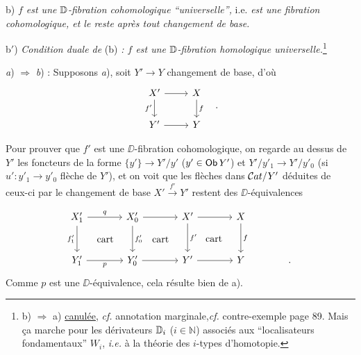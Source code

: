 \hspace*{\parindent}b) \textit{$f$ est une $\mathbb{D}$-fibration cohomologique ``universelle'',} i.e. \textit{est une fibration cohomologique, et le reste après tout changement de base.}

\hspace*{\parindent}b$'$) \textit{Condition duale de} (b) \textit{: $f$ est une $\mathbb{D}$-fibration homologique universelle.}\footnote[36]{b) $\Rightarrow$ a) \underline{canulée}, \textit{cf.} annotation marginale,\footnotemark[37] \textit{cf.} contre-exemple page 89. Mais ça marche pour les dérivateurs $\mathbb{D}_i$ ($i \in \mathbb{N}$) associés aux ``localisateurs fondamentaux'' $W_i$, \textit{i.e.} à la théorie des $i$-types d'homotopie.}

\textit{a}) $\Rightarrow$ \textit{b}) : Supposons \textit{a}), soit $Y' \to Y$ changement de base, d'où
\[
\begin{tikzcd}
X' \arrow[r] \arrow[d, "f'"'] & X \arrow[d, "f"] \\
Y' \arrow[r] & Y
\end{tikzcd}
\quad .
\]


Pour prouver que $f'$ est une $\DD$-fibration cohomologique, on regarde au dessus de $Y'$ les foncteurs de la forme $\{y'\} \to Y'/y'$ ($y' \in \mathsf{Ob}\, Y'$) et $Y'/y'_1 \to Y'/y'_0$ (si $u' : y'_1 \to y'_0$ flèche de $Y'$), et on voit que les flèches dans $\mathcal{C}at/Y'$ déduites de ceux-ci par le changement de base $X' \xrightarrow{f'} Y'$ restent des $\DD$-équivalences


\[
\begin{tikzcd}[column sep=large, row sep=large]
X'_1 \arrow[r, "q"] \arrow[d, "f'_1"'] \arrow[dr, phantom, "\text{cart}"] & X'_0 \arrow[r] \arrow[d, "f'_0"] \arrow[dr, phantom, "\text{cart}"] & X' \arrow[r] \arrow[d, "f'"] \arrow[dr, phantom, "\text{cart}"] & X \arrow[d, "f"] \\
Y'_1 \arrow[r, "p"'] & Y'_0 \arrow[r] & Y' \arrow[r] & Y & .
\end{tikzcd}
\]
Comme $p$ est une $\DD$-équivalence, cela résulte bien de a).

